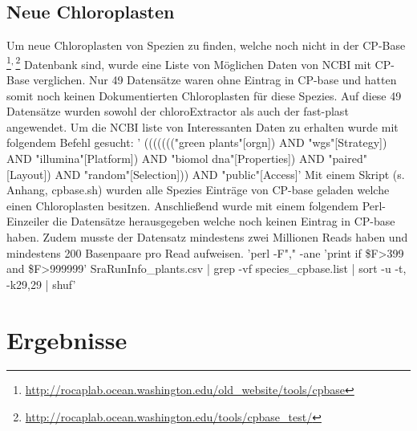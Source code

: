 \documentclass{scrartcl}
\begin{document}
\subsection{Neue Chloroplasten}
\label{sec-3-6}
Um neue Chloroplasten von Spezien zu finden, welche noch nicht in der CP-Base \footnote{\url{http://rocaplab.ocean.washington.edu/old_website/tools/cpbase}}\textsuperscript{,}\,\footnote{\url{http://rocaplab.ocean.washington.edu/tools/cpbase_test/}} Datenbank sind, wurde eine Liste von Möglichen Daten von NCBI mit CP-Base verglichen. Nur 49 Datensätze waren ohne 
Eintrag in CP-base und hatten somit noch keinen Dokumentierten Chloroplasten für diese Spezies. Auf diese 49 Datensätze wurden sowohl der chloroExtractor als auch der fast-plast angewendet. 
Um die NCBI liste von Interessanten Daten zu erhalten wurde mit folgendem Befehl gesucht: 
' ((((((("green plants"[orgn]) AND "wgs"[Strategy]) AND "illumina"[Platform]) AND "biomol dna"[Properties]) AND "paired"[Layout]) AND "random"[Selection])) AND "public"[Access]'
Mit einem Skript (s. Anhang, cpbase.sh) wurden alle Spezies Einträge von CP-base geladen welche einen Chloroplasten besitzen. Anschließend wurde mit einem folgendem Perl-Einzeiler
die Datensätze herausgegeben welche noch keinen Eintrag in CP-base haben. Zudem musste der Datensatz mindestens zwei Millionen Reads haben und mindestens 200 Basenpaare pro Read
aufweisen.
'perl -F"," -ane 'print if \$F\footnotemark[38]{}>399 and \$F\footnotemark[3]{}>999999' SraRunInfo\_plants.csv | grep -vf species\_cpbase.list | sort -u -t, -k29,29 | shuf'



\section{Ergebnisse}
\label{sec-4}
\end{document}
